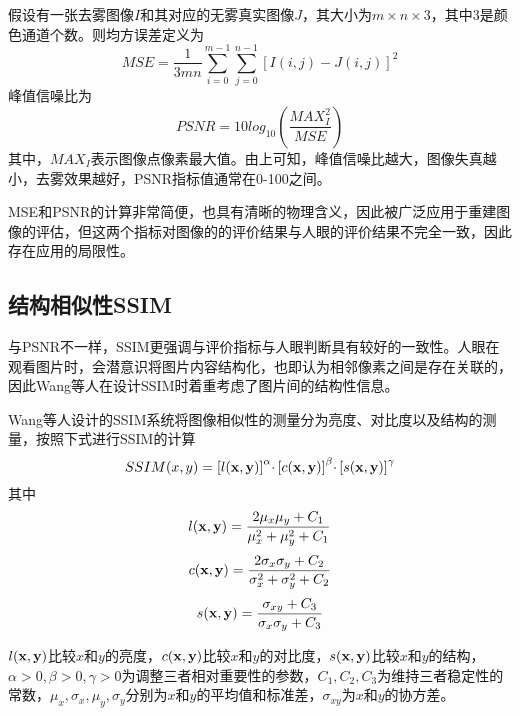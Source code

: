 \documentclass[a4paper, 12pt, oneside]{report}
\begin{document}
{假设有一张去雾图像$I$和其对应的无雾真实图像$J$，其大小为$m \times n \times 3$，其中3是颜色通道个数。则均方误差定义为
\begin{equation} \label{eq:4.4}
MSE = \frac{1}{3mn}\sum_{i = 0}^{m - 1}\sum_{j = 0}^{n - 1}{[I(i, j) - J(i, j)] }^2
\end{equation}
峰值信噪比为
\begin{equation} \label{eq:4.5}
PSNR = 10 log_{10}(\frac{MAX_I^2}{MSE})
\end{equation}
其中，$MAX_I$表示图像点像素最大值。由上可知，峰值信噪比越大，图像失真越小，去雾效果越好，PSNR指标值通常在0-100之间。
	
MSE和PSNR的计算非常简便，也具有清晰的物理含义，因此被广泛应用于重建图像的评估，但这两个指标对图像的的评价结果与人眼的评价结果不完全一致，因此存在应用的局限性。

\subsection{结构相似性SSIM\quad}
与PSNR不一样，SSIM更强调与评价指标与人眼判断具有较好的一致性。人眼在观看图片时，会潜意识将图片内容结构化，也即认为相邻像素之间是存在关联的，因此Wang\cite{ref24}等人在设计SSIM时着重考虑了图片间的结构性信息。
	
Wang等人设计的SSIM系统将图像相似性的测量分为亮度、对比度以及结构的测量，按照下式进行SSIM的计算
\begin{equation} \label{eq:4.6}
SSIM(x, y) = {[l{\bf (x, y)}]}^{\alpha}\cdotp {[c{\bf (x, y)}]}^{\beta}\cdotp {[s{\bf (x, y)}]}^{\gamma} 
\end{equation}
其中
\begin{equation} \label{eq:4.7}
l{\bf (x, y)} = \frac{2\mu_x\mu_y + C_1}{\mu_x^2 + \mu_y^2 + C_1}
\end{equation}
\begin{equation} \label{eq:4.8}
c{\bf (x, y)} = \frac{2\sigma_x\sigma_y + C_2}{\sigma_x^2 + \sigma_y^2 + C_2}
\end{equation}
\begin{equation} \label{eq:4.9}
s{\bf (x, y)} = \frac{\sigma_{xy}+ C_3}{\sigma_x\sigma_y + C_3}
\end{equation}

$l{\bf (x, y)}$比较$x$和$y$的亮度，$c{\bf (x, y)}$比较$x$和$y$的对比度，$s{\bf (x, y)}$比较$x$和$y$的结构，$\alpha > 0, \beta > 0, \gamma > 0$为调整三者相对重要性的参数，$C_1, C_2, C_3$为维持三者稳定性的常数，$\mu_x, \sigma_x, \mu_y, \sigma_y$分别为$x$和$y$的平均值和标准差，$\sigma_{xy}$为$x$和$y$的协方差。

}
\end{document}

